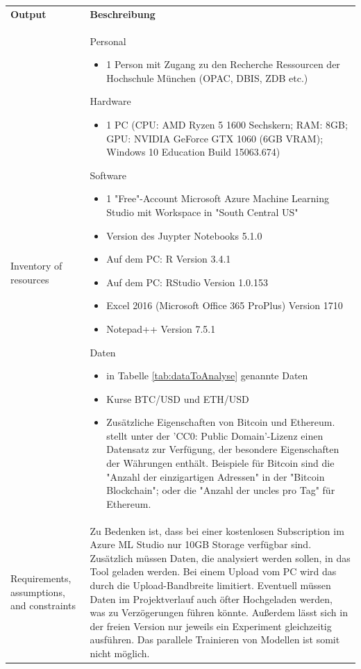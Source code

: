 \begin{centering} \begin{longtable}[H]{|p{}|p{10cm}|}
\hline
\textbf{Output} & \textbf{Beschreibung} \\ 
\hhline{==}
Inventory of resources & Personal
\begin{itemize}
\item 1 Person mit Zugang zu den Recherche Ressourcen der Hochschule München (OPAC, DBIS, ZDB etc.\citep{noauthor_hochschule_2017})
\end{itemize}
Hardware
\begin{itemize}
\item 1 PC (CPU: AMD Ryzen 5 1600 Sechskern; RAM: 8GB; GPU: NVIDIA GeForce GTX 1060 (6GB VRAM); Windows 10 Education Build 15063.674)
\end{itemize}
Software
\begin{itemize}
\item 1 "Free"-Account Microsoft Azure Machine Learning Studio mit Workspace in "South Central US"
\item Version des Juypter Notebooks 5.1.0
\item Auf dem PC: R Version 3.4.1
\item Auf dem PC: RStudio Version 1.0.153
\item Excel 2016 (Microsoft Office 365 ProPlus) Version 1710
\item Notepad++ Version 7.5.1
\end{itemize}
Daten
\begin{itemize}
\item in Tabelle \ref{tab:dataToAnalyse} genannte Daten
\item Kurse BTC/USD und ETH/USD
\item Zusätzliche Eigenschaften von Bitcoin und Ethereum. \citep{srk_cryptocurrency_2017} stellt unter der 'CC0: Public Domain'-Lizenz einen Datensatz zur Verfügung, der besondere Eigenschaften der Währungen enthält. Beispiele für Bitcoin sind die "Anzahl der einzigartigen Adressen" in der "Bitcoin Blockchain"; oder die "Anzahl der uncles pro Tag"\citep[eigene Übersetzung]{srk_cryptocurrency_2017} für Ethereum.
\end{itemize}
\\
\hline
Requirements, assumptions, and constraints & Zu Bedenken ist, dass bei einer kostenlosen Subscription im Azure ML Studio nur 10GB Storage verfügbar sind. Zusätzlich müssen Daten, die analysiert werden sollen, in das Tool geladen werden. Bei einem Upload vom PC wird das durch die Upload-Bandbreite limitiert. Eventuell müssen Daten im Projektverlauf auch öfter Hochgeladen werden, was zu Verzögerungen führen könnte. Außerdem lässt sich in der freien Version nur jeweils ein Experiment gleichzeitig ausführen. Das parallele Trainieren von Modellen ist somit nicht möglich.\newline 

\end{longtable}
\end{centering}
